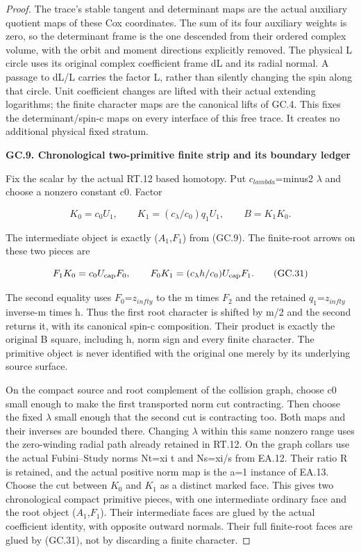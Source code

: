 \begin{proof}
The trace's stable tangent and determinant maps are the actual
auxiliary quotient maps of these Cox coordinates. The sum of its
four auxiliary weights is zero, so the determinant frame is the
one descended from their ordered complex volume, with the orbit
and moment directions explicitly removed. The physical L circle
uses its original complex coefficient frame dL and its radial
normal. A passage to dL/L carries the factor L, rather than
silently changing the spin along that circle. Unit coefficient
changes are lifted with their actual extending logarithms; the
finite character maps are the canonical lifts of GC.4. This fixes
the determinant/spin-c maps on every interface of this free trace.
It creates no additional physical fixed stratum.

\par

\medskip\noindent\textbf{GC.9. Chronological two-primitive finite strip and its boundary ledger}

\par\nobreak

Fix the scalar by the actual RT.12 based homotopy. Put
\(c_{lambda}\)=minus2 \(\lambda\) and choose a nonzero constant c0. Factor

\[
 K_0=c_0U_1,\qquad K_1=(c_\lambda/c_0)q_1U_1,
                              \qquad B=K_1K_0.
 \tag{GC.30}
\]

The intermediate object is exactly (\(A_1\),\(F_1\)) from (GC.9). The
finite-root arrows on these two pieces are

\[
 F_1K_0=c_0U_{\rm cap}F_0,\qquad
 F_0K_1=(c_\lambda h/c_0)U_{\rm cap}F_1.
 \tag{GC.31}
\]

The second equality uses \(F_0\)=\(z_{infty}\) to the m times \(F_2\) and the
retained \(q_1\)=\(z_{infty}\) inverse-m times h. Thus the first root
character is shifted by m/2 and the second returns it, with its
canonical spin-c composition. Their product is exactly the
original B square, including h, norm sign and every finite
character. The primitive object is never identified with the
original one merely by its underlying source surface.

On the compact source and root complement of the collision graph,
choose c0 small enough to make the first transported norm cut
contracting. Then choose the fixed \(\lambda\) small enough that the
second cut is contracting too. Both maps and their inverses are
bounded there. Changing \(\lambda\) within this same nonzero range
uses the zero-winding radial path already retained in RT.12.
On the graph collars use the actual Fubini--Study norms
Nt=\textbar xi\textbar{} \textbar\textbar t\textbar\textbar{} and Ns=\textbar xi\textbar/\textbar\textbar s\textbar\textbar{} from EA.12. Their ratio R is
retained, and the actual positive norm map is the a=1 instance
of EA.13. Choose the cut between \(K_0\) and \(K_1\) as a distinct marked
face. This gives two chronological compact primitive pieces,
with one intermediate ordinary face and the root object (\(A_1\),\(F_1\)).
Their intermediate faces are glued by the actual coefficient
identity, with opposite outward normals. Their full finite-root
faces are glued by (GC.31), not by discarding a finite character.


\end{proof}
